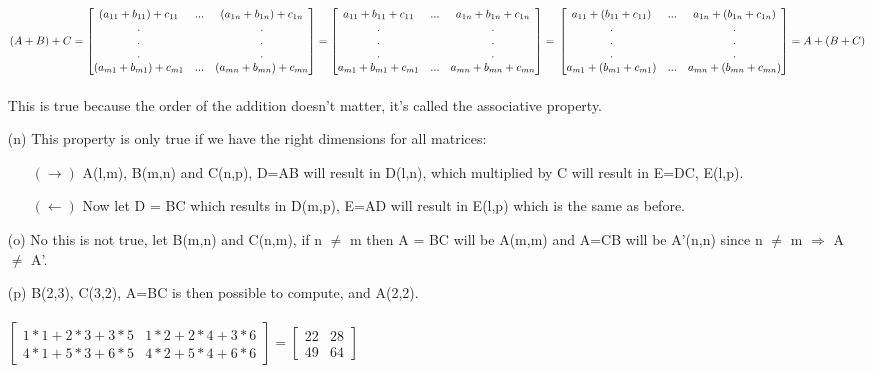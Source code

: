 \documentclass[a4paper]{article}
\begin{document}
\begin{itemize}
$
(A+B)+C =
\begin{bmatrix} 
(a_{11}+b_{11})+c_{11} & ... & (a_{1n}+b_{1n})+c_{1n}\\
.&&.\\
.&&.\\
.&&.\\
(a_{m1}+b_{m1})+c_{m1} & ... & (a_{mn}+b_{mn})+c_{mn} \\
\end{bmatrix}
=
\begin{bmatrix} 
a_{11}+b_{11}+c_{11} & ... & a_{1n}+b_{1n}+c_{1n}\\
.&&.\\
.&&.\\
.&&.\\
a_{m1}+b_{m1}+c_{m1} & ... & a_{mn}+b_{mn}+c_{mn} \\
\end{bmatrix}
=\\\\\\
\begin{bmatrix} 
a_{11}+(b_{11}+c_{11}) & ... & a_{1n}+(b_{1n}+c_{1n})\\
.&&.\\
.&&.\\
.&&.\\
a_{m1}+(b_{m1}+c_{m1}) & ... & a_{mn}+(b_{mn}+c_{mn}) \\
\end{bmatrix}
= A+(B+C)
$\\\\ This is true because the order of the addition doesn't matter, it's called the associative property.
\item[(n)] This property is only true if we have the right dimensions for all matrices:
\begin{itemize}
\item[$(\rightarrow)$]A(l,m), B(m,n) and C(n,p), D=AB will result in D(l,n), which multiplied by C will result in E=DC, E(l,p).
\item[$(\leftarrow)$]Now let D = BC which results in D(m,p), E=AD will result in E(l,p) which is the same as before.
\end{itemize}

\item[(o)] No this is not true, let B(m,n) and C(n,m), if n $\neq$ m then A = BC will be A(m,m) and A=CB will be A'(n,n) since n $\neq$ m $\Rightarrow$ A $\neq$ A'.

\item[(p)] B(2,3), C(3,2), A=BC is then possible to compute, and A(2,2).\\\\
$
\begin{bmatrix} 
1*1 + 2*3 + 3*5 & 1*2 + 2*4 + 3*6\\
4*1 + 5*3 + 6*5 & 4*2 + 5*4 + 6*6
\end{bmatrix}
=
\begin{bmatrix} 
22 & 28\\
49 & 64
\end{bmatrix}
$


\end{itemize}
\end{document}
